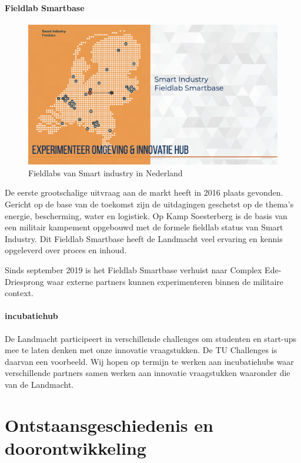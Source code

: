\documentclass[
]{book}
\begin{document}
\hypertarget{fieldlab-smartbase}{%
\subsubsection{Fieldlab Smartbase}\label{fieldlab-smartbase}}

\begin{figure}

{\centering \includegraphics[width=0.5\linewidth]{data/keynote-slides/20200430-CDE-Designprocess/20200430-CDE-Designprocess.009-6} 

}

\caption{Fieldlabs van Smart industry in Nederland }\label{fig:unnamed-chunk-13}
\end{figure}

De eerste grootschalige uitvraag aan de markt heeft in 2016 plaats gevonden. Gericht op de base van de toekomst zijn de uitdagingen geschetst op de thema's energie, bescherming, water en logistiek. Op Kamp Soesterberg is de basis van een militair kampement opgebouwd met de formele fieldlab status van Smart Industry. Dit Fieldlab Smartbase heeft de Landmacht veel ervaring en kennis opgeleverd over proces en inhoud.

Sinds september 2019 is het Fieldlab Smartbase verhuist naar Complex Ede-Driesprong waar externe partners kunnen experimenteren binnen de militaire context.

\hypertarget{incubatiehub}{%
\subsubsection{incubatiehub}\label{incubatiehub}}

De Landmacht participeert in verschillende challenges om studenten en start-ups mee te laten denken met onze innovatie vraagstukken. De TU Challenges is daarvan een voorbeeld. Wij hopen op termijn te werken aan incubatiehubs waar verschillende partners samen werken aan innovatie vraagstukken waaronder die van de Landmacht.

\hypertarget{cde-process}{%
\chapter{Ontstaansgeschiedenis en doorontwikkeling}\label{cde-process}}
\end{document}
